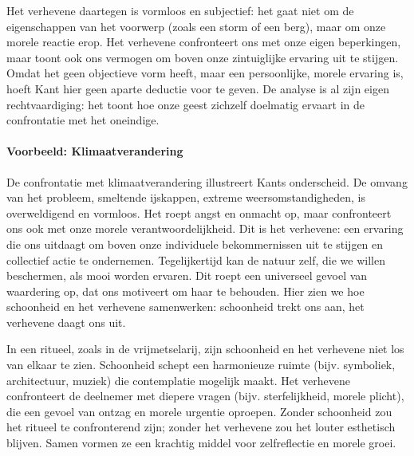 \begin{mdframed}[leftmargin=0pt,rightmargin=0pt,backgroundcolor=blue!6,linecolor=white,innertopmargin=6pt,innerbottommargin=6pt]
Het verhevene daartegen is vormloos en subjectief: het gaat niet om de eigenschappen van het voorwerp (zoals een storm of een berg), maar om onze morele reactie erop. Het verhevene confronteert ons met onze eigen beperkingen, maar toont ook ons vermogen om boven onze zintuiglijke ervaring uit te stijgen. Omdat het geen objectieve vorm heeft, maar een persoonlijke, morele ervaring is, hoeft Kant hier geen aparte deductie voor te geven. De analyse is al zijn eigen rechtvaardiging: het toont hoe onze geest zichzelf doelmatig ervaart in de confrontatie met het oneindige.

\paragraph{Voorbeeld: Klimaatverandering}
De confrontatie met klimaatverandering illustreert Kants onderscheid. De omvang van het probleem, smeltende ijskappen, extreme weersomstandigheden, is overweldigend en vormloos. Het roept angst en onmacht op, maar confronteert ons ook met onze morele verantwoordelijkheid. Dit is het verhevene: een ervaring die ons uitdaagt om boven onze individuele bekommernissen uit te stijgen en collectief actie te ondernemen. Tegelijkertijd kan de natuur zelf, die we willen beschermen, als mooi worden ervaren. Dit roept een universeel gevoel van waardering op, dat ons motiveert om haar te behouden. Hier zien we hoe schoonheid en het verhevene samenwerken: schoonheid trekt ons aan, het verhevene daagt ons uit.

In een ritueel, zoals in de vrijmetselarij, zijn schoonheid en het verhevene niet los van elkaar te zien. Schoonheid schept een harmonieuze ruimte (bijv. symboliek, architectuur, muziek) die contemplatie mogelijk maakt. Het verhevene confronteert de deelnemer met diepere vragen (bijv. sterfelijkheid, morele plicht), die een gevoel van ontzag en morele urgentie oproepen. Zonder schoonheid zou het ritueel te confronterend zijn; zonder het verhevene zou het louter esthetisch blijven. Samen vormen ze een krachtig middel voor zelfreflectie en morele groei.

\end{mdframed}


